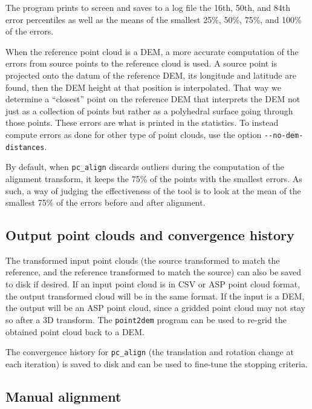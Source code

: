 The program prints to screen and saves to a log file the 16th, 50th, and
84th error percentiles as well as the means of the smallest 25\%, 50\%,
75\%, and 100\% of the errors.

When the reference point cloud is a DEM, a more accurate computation of
the errors from source points to the reference cloud is used. A source
point is projected onto the datum of the reference DEM, its longitude
and latitude are found, then the DEM height at that position is
interpolated.  That way we determine a ``closest'' point on the
reference DEM that interprets the DEM not just as a collection of points
but rather as a polyhedral surface going through those points. These
errors are what is printed in the statistics. To instead compute
errors as done for other type of point clouds, use the option
\texttt{-\/-no-dem-distances}.

By default, when \texttt{pc\_align} discards outliers during the
computation of the alignment transform, it keeps the 75\% of the points
with the smallest errors. As such, a way of judging the effectiveness of
the tool is to look at the mean of the smallest 75\% of the errors
before and after alignment.

\subsection{Output point clouds and convergence history}

The transformed input point clouds (the source transformed to match the
reference, and the reference transformed to match the source) can also
be saved to disk if desired. If an input point cloud is in CSV or ASP
point cloud format, the output transformed cloud will be in the same
format. If the input is a DEM, the output will be an ASP point cloud,
since a gridded point cloud may not stay so after a 3D transform. The
\texttt{point2dem} program can be used to re-grid the obtained point
cloud back to a DEM.

The convergence history for \texttt{pc\_align} (the translation and
rotation change at each iteration) is saved to disk and can be used to
fine-tune the stopping criteria.

\subsection{Manual alignment}

